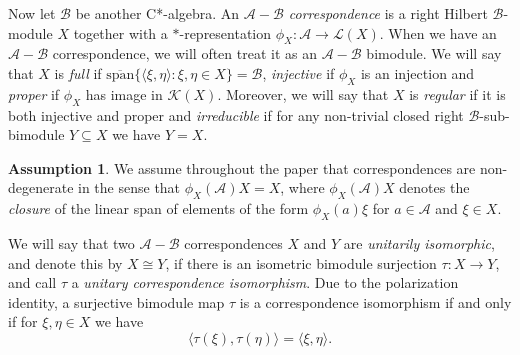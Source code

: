 \documentclass[11pt, letterpaper,final]{amsart}
\newcommand{\A}{{\mathcal{A}}}
\newcommand{\B}{{\mathcal{B}}}
\newcommand{\K}{{\mathcal{K}}}
\renewcommand{\L}{{\mathcal{L}}}
\theoremstyle{definition}
\newtheorem{asmp}[thm]{Assumption}
\begin{document}
Now let $\B$ be another C*-algebra. An \emph{$\A-\B$ correspondence} is a right Hilbert $\B$-module $X$ together with a $*$-representation $\phi_X : \A \rightarrow \L(X)$. When we have an $\A-\B$ correspondence, we will often treat it as an $\A-\B$ bimodule. We will say that $X$ is \emph{full} if $\overline{\mathrm{span}} \{ \langle \xi, \eta \rangle : \xi, \eta \in X \} = \B$, \emph{injective} if $\phi_X$ is an injection and \emph{proper} if $\phi_X$ has image in $\K(X)$. Moreover, we will say that $X$ is \emph{regular} if it is both injective and proper and \emph{irreducible} if for any non-trivial closed right $\B$-sub-bimodule $Y \subseteq X$ we have $Y=X$.

\begin{asmp} \label{a:nd}
We assume throughout the paper that correspondences are non-degenerate in the sense that $\phi_X(\A)X = X$, where $\phi_X(\A)X$ denotes the \emph{closure} of the linear span of elements of the form $\phi_X(a)\xi$ for $a\in \A$ and $\xi \in X$. 
\end{asmp}

We will say that two $\A-\B$ correspondences $X$ and $Y$ are \emph{unitarily isomorphic}, and denote this by $X\cong Y$, if there is an isometric bimodule surjection $\tau: X \rightarrow Y$, and call $\tau$ a \emph{unitary correspondence isomorphism}. Due to the polarization identity, a surjective bimodule map $\tau$ is a correspondence isomorphism if and only if for $\xi,\eta \in X$ we have
$$
\langle \tau(\xi),\tau(\eta) \rangle = \langle \xi,\eta \rangle.
$$ 
\end{document}
